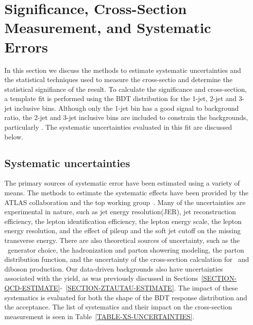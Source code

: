 \chapter{Significance, Cross-Section Measurement, and Systematic Errors}
In this section we discuss the methods to estimate systematic uncertainties and the statistical techniques used to measure the cross-sectio and determine the statistical signifiance of the result. To calculate the significance and cross-section, a template fit is performed using the BDT distribution for the 1-jet, 2-jet and 3-jet inclusive bins. Although only the 1-jet bin has a good signal to background ratio, the 2-jet and 3-jet inclusive bins are included to constrain the backgrounds, particularly \ttbar. The systematic uncertainties evaluated in this fit are discussed below.

\section{Systematic uncertainties}
\label{SECTION-SYSTEMATICS}
The primary sources of systematic error have been estimated using a variety of means. The methods to estimate the systematic effects have been provided by the ATLAS collaboration and the top working group~\cite{TOPCOMMONSYSTEMATICS}. Many of the uncertainties are experimental in nature, such as jet energy resolution(JER), jet reconstruction efficiency, the lepton identification efficiency, the lepton energy scale, the lepton energy resolution, and the effect of pileup and the soft jet cutoff on the missing transverse energy. There are also theoretical sources of uncertainty, such as the \MC\ generator choice, the hadronization and parton showering modeling, the parton distribution function, and the uncertainty of the cross-section calculation for \ttbar\ and diboson production. Our data-driven backgrounds also have uncertainties associated with the yield, as was previously discussed in Sections~\ref{SECTION-QCD-ESTIMATE}-~\ref{SECTION-ZTAUTAU-ESTIMATE}. The impact of these systematics is evaluated for both the shape of the BDT response distribution and the acceptance. The list of systematics and their impact on the cross-section measurement is seen in Table~\ref{TABLE-XS-UNCERTAINTIES}.\\


{}

